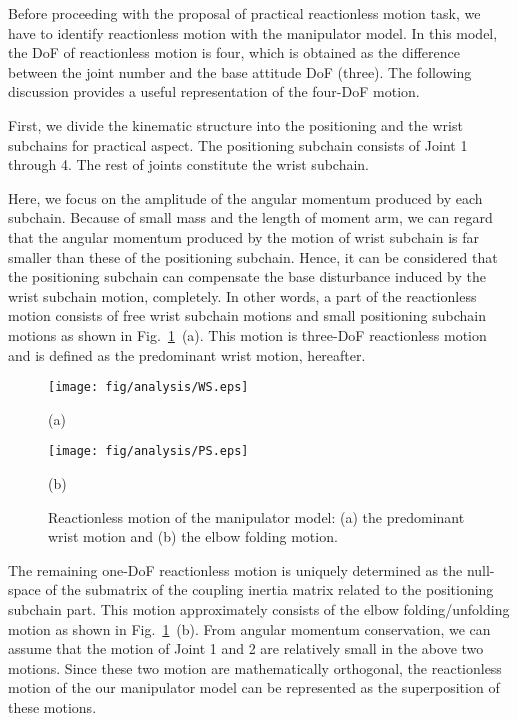\documentclass[preprint,12pt]{elsarticle}
\def\fig#1{{Fig.~\ref{fig:#1}}}
\begin{document}
Before proceeding with the proposal of practical reactionless motion task,
we have to identify reactionless motion with the manipulator model.
In this model,
the DoF of reactionless motion is four,
which is obtained as the difference between the joint number
and the base attitude DoF (three).
The following discussion provides a useful representation of the four-DoF motion.

First,
we divide the kinematic structure into the positioning and the wrist subchains for practical aspect.
The positioning subchain consists of Joint 1 through 4.
The rest of joints constitute the wrist subchain.

Here, we focus on the amplitude of the angular momentum produced by each subchain.
Because of small mass and the length of moment arm,
we can regard that the angular momentum produced by the motion of wrist subchain is far smaller than these of the positioning subchain.
Hence,
it can be considered that the positioning subchain can compensate the base disturbance induced by 
the wrist subchain motion, completely.
In other words,
a part of the reactionless motion consists of free wrist subchain motions and
small positioning subchain motions as shown in \fig{motion}~(a).
This motion is three-DoF reactionless motion and is defined as
the predominant wrist motion, hereafter.
%
\begin{figure}[t]
  \centering
  \begin{minipage}[h]{0.4\linewidth}
    \centering
    \texttt{[image: fig/analysis/WS.eps]}
    \footnotesize\par{(a)}
  \end{minipage}
  \begin{minipage}[h]{0.4\linewidth}
    \centering
    \texttt{[image: fig/analysis/PS.eps]}
    \footnotesize\par{(b)}
  \end{minipage}
  \caption{Reactionless motion of the manipulator model: (a) the predominant wrist motion and (b) the elbow folding motion.}
  \label{fig:motion}
\end{figure}
%

The remaining one-DoF reactionless motion is uniquely determined as the null-space 
of the submatrix of the coupling inertia matrix related to the positioning subchain part.
This motion approximately consists of the elbow folding/unfolding motion as shown in \fig{motion}~(b).
From angular momentum conservation,
we can assume that the motion of Joint 1 and 2 are relatively small in the above two motions.
Since these two motion are mathematically orthogonal,
the reactionless motion of the our manipulator model can be represented as
the superposition of these motions.
\end{document}
